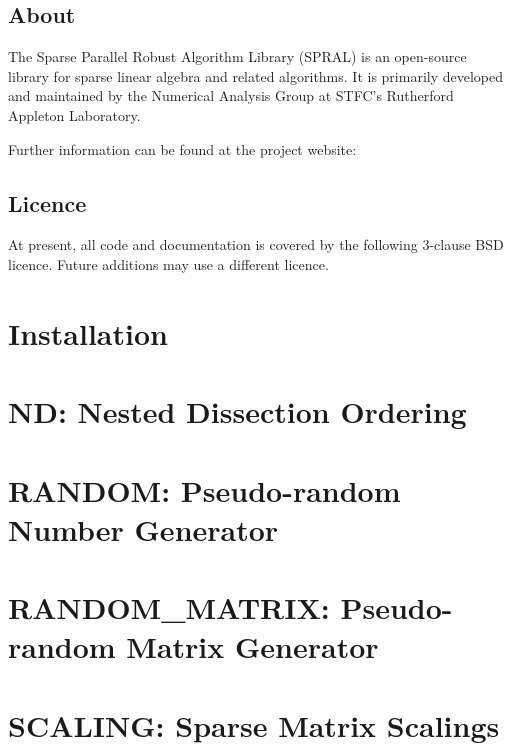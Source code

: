 \documentclass{spralweb}
\begin{document}
\tableofcontents

\let\oldthesection\thesection
\renewcommand{\thesection}{}
\section{About}
The Sparse Parallel Robust Algorithm Library (SPRAL) is an open-source library
for sparse linear algebra and related algorithms. It is primarily developed and
maintained by the Numerical Analysis Group at STFC's Rutherford Appleton Laboratory.

\noindent
Further information can be found at the project website:

\section{Licence}
At present, all code and documentation is covered by the following 3-clause BSD
licence. Future additions may use a different licence.



\renewcommand{\thesection}{\oldthesection}

\chapter{Installation}

\chapter{ND: Nested Dissection Ordering}

\chapter{RANDOM: Pseudo-random Number Generator}

\chapter{RANDOM\_MATRIX: Pseudo-random Matrix Generator}

\chapter{SCALING: Sparse Matrix Scalings}

\end{document}

